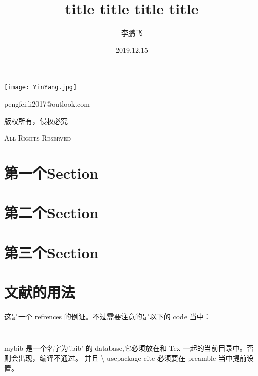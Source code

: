 \documentclass[UTF8,fancyhdr,a4paper]{ctexart}
\title{title title title title}
\author{李鹏飞}
\date{2019.12.15}
\begin{document}
\begin{titlepage}
\maketitle
{}
\centering
\vspace{10cm}
\texttt{[image: YinYang.jpg]}\par
\vspace{1cm}
{\huge pengfei.li2017@outlook.com}\par
\vspace{0.5cm}
{\small 版权所有，侵权必究}\par
\vspace{0.5cm}
{\scshape \small All Rights Reserved}
\end{titlepage}

\tableofcontents
{}%
\clearpage
\listoffigures
{}
\clearpage
\listoftables
{}
\clearpage

\newpage
{}
\section{第一个Section}

\newpage
\section{第二个Section}

\newpage
\section{第三个Section}

\newpage
\section{文献的用法}

 这是一个 refrences\cite{7398117} 的例证。不过需要注意的是以下的 code 当中：

\begin{lstlisting}[language = Python]
    
\end{lstlisting}
mybib 是一个名字为\space'.bib' 的 database,它必须放在和 Tex 一起的当前目录中。否则会出现，编译不通过。
并且 {\textbackslash} usepackage cite 必须要在 preamble 当中提前设置。{\texttilde}\\
\end{document}
